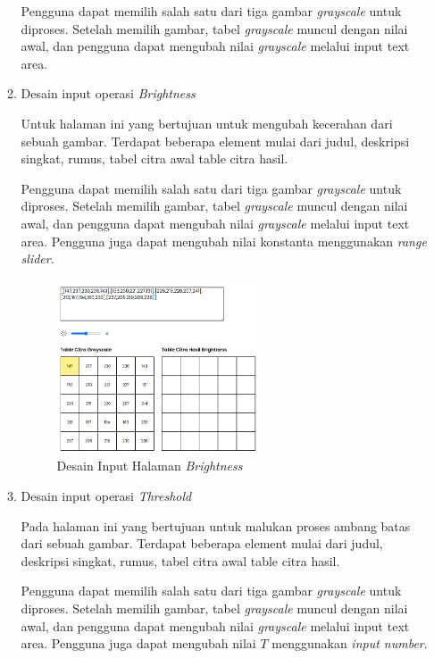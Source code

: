 \begin{enumerate}[leftmargin=1cm, itemindent=0.6cm,labelwidth=15pt, labelsep=5pt, listparindent=1cm,align=left]
\begin{enumerate}[leftmargin=1cm, itemindent=0.6cm,labelwidth=15pt, labelsep=5pt, listparindent=1cm,align=left]
Pengguna dapat memilih salah satu dari tiga gambar \textit{grayscale} untuk diproses. Setelah memilih gambar, tabel \textit{grayscale} muncul dengan nilai awal, dan pengguna dapat mengubah nilai \textit{grayscale} melalui input text area.

    \item Desain input operasi \textit{Brightness}

Untuk halaman ini yang bertujuan untuk mengubah kecerahan dari sebuah gambar. Terdapat beberapa element mulai dari judul, deskripsi singkat, rumus, tabel citra awal table citra hasil.

Pengguna dapat memilih salah satu dari tiga gambar \textit{grayscale} untuk diproses. Setelah memilih gambar, tabel \textit{grayscale} muncul dengan nilai awal, dan pengguna dapat mengubah nilai \textit{grayscale} melalui input text area. Pengguna juga dapat mengubah nilai konstanta menggunakan \textit{range slider}.

          \begin{figure}[ht]
    	      \includegraphics[width=0.6\textwidth, center]{images/input-brightness.png}
              \caption{Desain Input Halaman \textit{Brightness}}
          \end{figure}

    \item Desain input operasi \textit{Threshold}

Pada halaman ini yang bertujuan untuk malukan proses ambang batas dari sebuah gambar. Terdapat beberapa element mulai dari judul, deskripsi singkat, rumus, tabel citra awal table citra hasil.

Pengguna dapat memilih salah satu dari tiga gambar \textit{grayscale} untuk diproses. Setelah memilih gambar, tabel \textit{grayscale} muncul dengan nilai awal, dan pengguna dapat mengubah nilai \textit{grayscale} melalui input text area. Pengguna juga dapat mengubah nilai \(T\) menggunakan \textit{input number}.


\end{enumerate}
\end{enumerate}
